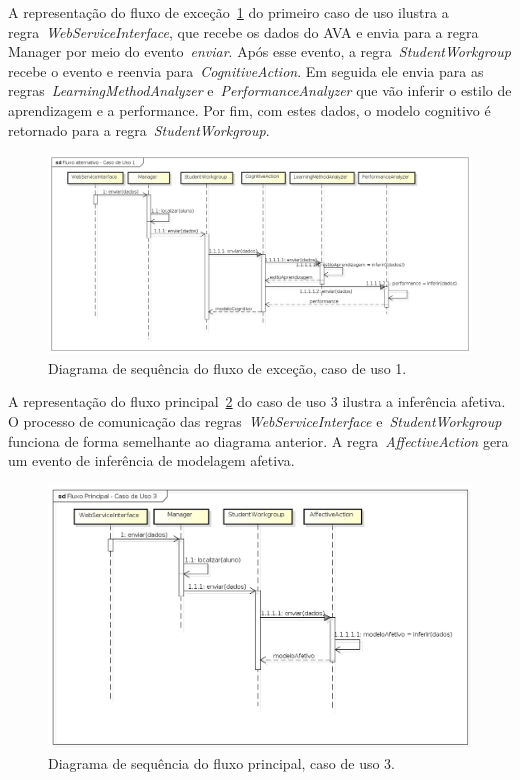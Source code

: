 A representação do fluxo de exceção~\ref{fig:dss-uc1-fluxo-alternativo} do primeiro caso de uso ilustra a regra~\emph{WebServiceInterface}, que recebe os dados do AVA e envia para a regra Manager por meio do evento~\emph{enviar}. Após esse evento, a regra~\emph{StudentWorkgroup} recebe o evento e reenvia para~\emph{CognitiveAction}. Em seguida ele envia para as regras~\emph{LearningMethodAnalyzer} e~\emph{PerformanceAnalyzer} que vão inferir o estilo de aprendizagem e a performance. Por fim, com estes dados, o modelo cognitivo é retornado para a regra~\emph{StudentWorkgroup}.

\begin{figure}
	\centering
	\includegraphics[scale=0.48]{images/dss-uc1-fluxo-alternativo}
	\caption{Diagrama de sequência do fluxo de exceção, caso de uso 1.}
	\label{fig:dss-uc1-fluxo-alternativo}
\end{figure}

A representação do fluxo principal~\ref{fig:dss-uc3-fluxo-principal} do caso de uso 3 ilustra a inferência afetiva. O processo de comunicação das regras~\emph{WebServiceInterface} e~\emph{StudentWorkgroup} funciona de forma semelhante ao diagrama anterior. A regra~\emph{AffectiveAction} gera um evento de inferência de modelagem afetiva.

\begin{figure}
	\centering
	\includegraphics[scale=0.48]{images/dss-uc3-fluxo-principal.png}
	\caption{Diagrama de sequência do fluxo principal, caso de uso 3.}
	\label{fig:dss-uc3-fluxo-principal}
\end{figure}

